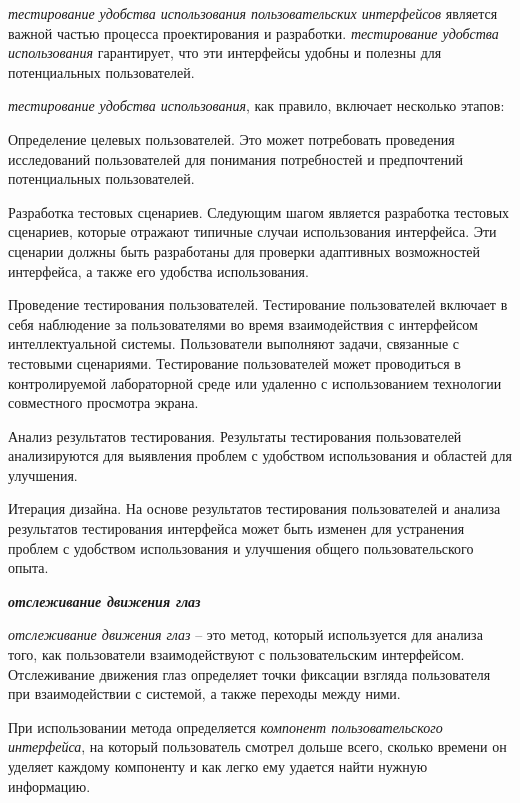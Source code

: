 \textit{тестирование удобства использования пользовательских интерфейсов} является важной частью процесса проектирования и разработки. \textit{тестирование удобства использования} гарантирует, что эти интерфейсы удобны и полезны для потенциальных пользователей.

\textit{тестирование удобства использования}, как правило, включает несколько этапов:

\begin{textitemize}
	\item Определение целевых пользователей. Это может потребовать проведения исследований пользователей для понимания потребностей и предпочтений потенциальных пользователей.
	\item Разработка тестовых сценариев. Следующим шагом является разработка тестовых сценариев, которые отражают типичные случаи использования интерфейса. Эти сценарии должны быть разработаны для проверки адаптивных возможностей интерфейса, а также его удобства использования.
	\item Проведение тестирования пользователей. Тестирование пользователей включает в себя наблюдение за пользователями во время взаимодействия с интерфейсом интеллектуальной системы. Пользователи выполняют задачи, связанные с тестовыми сценариями. Тестирование пользователей может проводиться в контролируемой лабораторной среде или удаленно с использованием технологии совместного просмотра экрана.
	\item Анализ результатов тестирования. Результаты тестирования пользователей анализируются для выявления проблем с удобством использования и областей для улучшения.
	\item Итерация дизайна. На основе результатов тестирования пользователей и анализа результатов тестирования интерфейса может быть изменен для устранения проблем с удобством использования и улучшения общего пользовательского опыта.
\end{textitemize}


\textbf{\textit{отслеживание движения глаз}} 


\textit{отслеживание движения глаз} -- это метод, который используется для анализа того, как пользователи взаимодействуют с пользовательским интерфейсом. Отслеживание движения глаз определяет точки фиксации взгляда пользователя при взаимодействии с системой, а также переходы между ними. 

При использовании метода определяется \textit{компонент пользовательского интерфейса}, на который пользователь смотрел дольше всего, сколько времени он уделяет каждому компоненту и как легко ему удается найти нужную информацию.

